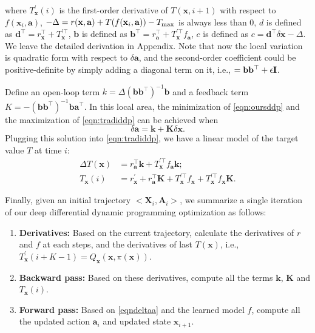 \documentclass{article} %
\begin{document}
where $ T_{\mathbf{x}}^{\prime}(i)$ is the first-order derivative of $T(\mathbf{x}, i+1)$ with respect to $f(\mathbf{x}_i, \mathbf{a})$, $-\Delta = r(\mathbf{x}, \mathbf{a}) +T(f(\mathbf{x}_i, \mathbf{a})) - T_{\textnormal{max}}$ is always less than 0, $d$ is defined as $\mathbf{d}^\top = r_{\mathbf{x}}^\top + T_{\mathbf{x}}^{\prime\top}$, $\mathbf{b}$ is defined as $\mathbf{b}^\top = r_{\mathbf{a}}^\top + T_{\mathbf{x}}^{\prime\top} f_{\mathbf{a}}$, $c$ is defined as $c=\mathbf{d}^\top \delta \mathbf{x} -\Delta$. We leave the detailed derivation in Appendix. Note that now the local variation is quadratic form with respect to $\delta \mathbf{a}$, and the second-order  coefficient could be positive-definite by simply adding a diagonal term on it, i.e., $\title{\mathbf{b}\mathbf{b}^\top} =  \mathbf{b}\mathbf{b}^\top + \epsilon \mathbf{I}$.

Define an open-loop term $k=\Delta(\mathbf{b}\mathbf{b}^\top)^{-1}\mathbf{b}$ and a feedback term $K=-(\mathbf{b}\mathbf{b}^\top)^{-1}\mathbf{b}\mathbf{a}^{\top}$. In this local area, the minimization of \eqref{eqn:oursddp} and the maximization of \eqref{eqn:tradiddp} can be achieved when 
\begin{equation}\label{eqndeltaa}
\delta \mathbf{a} = \mathbf{k} + \mathbf{K} \delta \mathbf{x}.    
\end{equation}
Plugging this solution into \eqref{eqn:tradiddp}, we have a linear model of the target value $T$ at time $i$:
\begin{equation}
    \begin{aligned}
        \Delta T(\mathbf{x}) &= r_{\mathbf{a}}^\top \mathbf{k} + T_{\mathbf{x}}^{\prime \top} f_{\mathbf{a}}\mathbf{k};\\
        T_{\mathbf{x}}(i) &= r_{\mathbf{x}}^\prime + r_\mathbf{a}^\top \mathbf{K} + T_{\mathbf{x}}^{\prime\top}f_{\mathbf{x}} + T_{\mathbf{x}}^{\prime\top}f_{\mathbf{x}} \mathbf{K}.
    \end{aligned}
\end{equation}

Finally, given an initial trajectory $<\mathbf{X}_i,\mathbf{A}_i>$, we summarize a single iteration of our deep differential dynamic programming optimization as follows:
\begin{enumerate}
    \item \textbf{Derivatives:} Based on the current trajectory, calculate the derivatives of $r$ and $f$ at each steps, and the derivatives of last $T(\mathbf{x})$, i.e., $T_{\mathbf{x}}^{\prime}(i+K-1)=Q_{\mathbf{x}}(\mathbf{x}, \pi(\mathbf{x}))$.
    \item \textbf{Backward pass:} Based on these derivatives, compute all the terms $\mathbf{k}$, $\mathbf{K}$ and $T_{\mathbf{x}}(i)$.
    \item \textbf{Forward pass:} Based on \eqref{eqndeltaa} and the learned model $f$, compute all the updated action $\mathbf{a}_i$ and updated state $\mathbf{x}_{i+1}$.
\end{enumerate}
\end{document}
